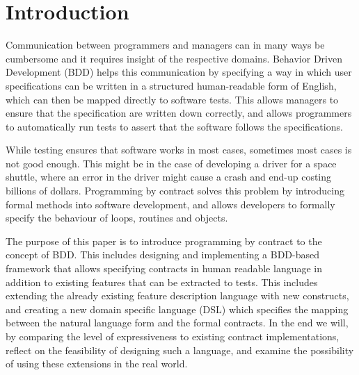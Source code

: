 \section{Introduction} %

Communication between programmers and managers can in many ways be cumbersome and it requires insight of the respective domains. Behavior Driven Development (BDD) \cite{hellesoy2012} helps this communication by specifying a way in which user specifications can be written in a structured human-readable form of English, which can then be mapped directly to software tests. This allows managers to ensure that the specification are written down correctly, and allows programmers to automatically run tests to assert that the software follows the specifications. 

While testing ensures that software works in most cases, sometimes most cases is not good enough. This might be in the case of developing a driver for a space shuttle, where an error in the driver might cause a crash and end-up costing billions of dollars.  Programming by contract solves this problem by introducing formal methods into software development, and allows developers to formally specify the behaviour of loops, routines and objects. 

The purpose of this paper is to introduce programming by contract to the concept of BDD. This includes designing and implementing a BDD-based framework that allows specifying contracts in human readable language in addition to existing features that can be extracted to tests. This includes extending the already existing feature description language with new constructs, and creating a new domain specific language (DSL) which specifies the mapping between the natural language form and the formal contracts. In the end we will, by comparing the level of expressiveness to existing contract implementations, reflect on the feasibility of designing such a language, and examine the possibility of using these extensions in the real world. 

